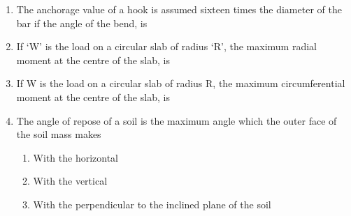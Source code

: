 \documentclass[11pt,a4paper]{article}
\begin{document}
\begin{enumerate}
\item{The anchorage value of a hook is assumed sixteen times the diameter of the bar if the angle of the bend, is}
\\
\item{If `W' is the load on a circular slab of radius `R', the maximum radial moment at the centre of the slab, is
}
\\
\item{If W is the load on a circular slab of radius R, the maximum circumferential moment at the centre of the slab, is}
\\
\item{The angle of repose of a soil is the maximum angle which the outer face of the soil mass makes}
\begin{enumerate}[label=\Alph*.]
\item{With the horizontal}
\item{With the vertical}
\item{With the perpendicular to the inclined plane of the soil}

\end{enumerate}
\end{enumerate}
\end{document}
